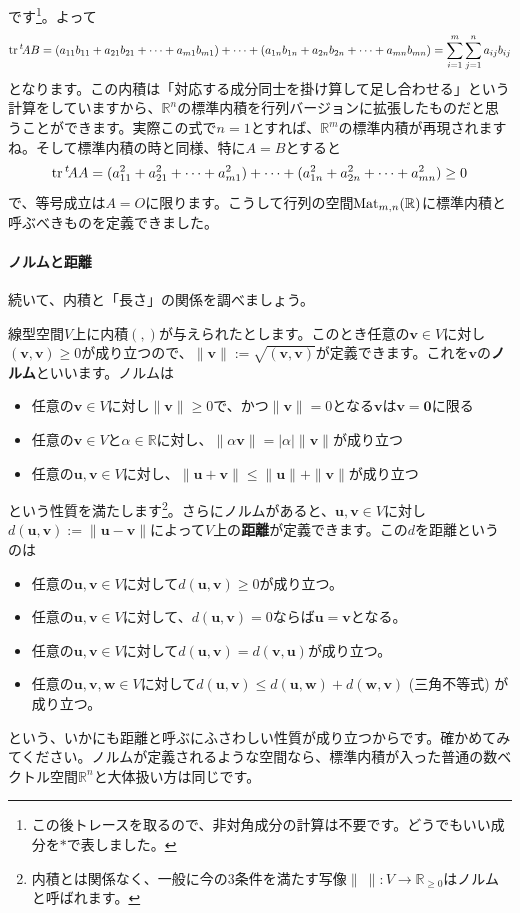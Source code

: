 です\footnote{この後トレースを取るので、非対角成分の計算は不要です。どうでもいい成分を$*$で表しました。}。よって
\[
\operatorname{tr} {}^t\!A B
= (a_{11}b_{11} + a_{21}b_{21} + \cdots + a_{m1}b_{m1}) + \cdots + (a_{1n}b_{1n} + a_{2n}b_{2n} + \cdots + a_{mn}b_{mn})
= \sum_{i = 1}^{m} \sum_{j = 1}^n a_{ij}b_{ij}
\]
となります。この内積は「対応する成分同士を掛け算して足し合わせる」という計算をしていますから、$\mathbb{R}^n$の標準内積を行列バージョンに拡張したものだと思うことができます。実際この式で$n = 1$とすれば、$\mathbb{R}^m$の標準内積が再現されますね。そして標準内積の時と同様、特に$A = B$とすると
\[
\operatorname{tr} {}^t\!A A = (a_{11}^2 + a_{21}^2 + \cdots + a_{m1}^2) + \cdots + (a_{1n}^2 + a_{2n}^2 + \cdots + a_{mn}^2) \geq 0
\]
で、等号成立は$A = O$に限ります。こうして行列の空間$\operatorname{Mat}_{m, n}(\mathbb{R})$に標準内積と呼ぶべきものを定義できました。

\paragraph{ノルムと距離} 続いて、内積と「長さ」の関係を調べましょう。

線型空間$V$上に内積$(, )$が与えられたとします。このとき任意の$\bm{v} \in V$に対し$(\bm{v}, \bm{v}) \geq 0$が成り立つので、$\|\bm{v}\| := \sqrt{(\bm{v}, \bm{v})}$が定義できます。これを$\bm{v}$の\textbf{ノルム}といいます。ノルムは
\begin{itemize}
\item 任意の$\bm{v} \in V$に対し$\|\bm{v}\|\geq 0$で、かつ$\|\bm{v}\| = 0$となる$\bm{v}$は$\bm{v} = \bm{0}$に限る
\item 任意の$\bm{v} \in V$と$\alpha\in\mathbb{R}$に対し、$\|\alpha\bm{v}\| = |\alpha|\|\bm{v}\|$が成り立つ
\item 任意の$\bm{u}, \bm{v} \in V$に対し、$\|\bm{u} + \bm{v}\| \leq \|\bm{u}\| + \|\bm{v}\|$が成り立つ
\end{itemize}
という性質を満たします\footnote{内積とは関係なく、一般に今の$3$条件を満たす写像$\|\ \|\colon V\rightarrow\mathbb{R}_{\geq 0}$はノルムと呼ばれます。}。さらにノルムがあると、$\bm{u}, \bm{v} \in V$に対し$d(\bm{u}, \bm{v}) := \|\bm{u} - \bm{v}\|$によって$V$上の\textbf{距離}が定義できます。この$d$を距離というのは
\begin{itemize}
\item 任意の$\bm{u}, \bm{v} \in V$に対して$d(\bm{u}, \bm{v}) \geq 0$が成り立つ。
\item 任意の$\bm{u}, \bm{v} \in V$に対して、$d(\bm{u}, \bm{v}) = 0$ならば$\bm{u} = \bm{v}$となる。
\item 任意の$\bm{u}, \bm{v} \in V$に対して$d(\bm{u}, \bm{v}) = d(\bm{v}, \bm{u})$が成り立つ。
\item 任意の$\bm{u}, \bm{v}, \bm{w} \in V$に対して$d(\bm{u}, \bm{v}) \leq d(\bm{u}, \bm{w}) + d(\bm{w}, \bm{v})$ (三角不等式) が成り立つ。
\end{itemize}
という、いかにも距離と呼ぶにふさわしい性質が成り立つからです。確かめてみてください。ノルムが定義されるような空間なら、標準内積が入った普通の数ベクトル空間$\mathbb{R}^n$と大体扱い方は同じです。

